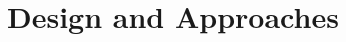 \documentclass[Dissertation.tex]{subfiles}
\begin{document}
\chapter{Design and Approaches}\label{designAndBuild}
\end{document}
